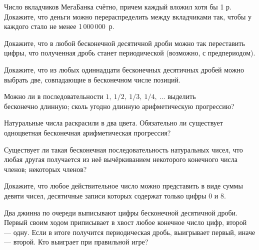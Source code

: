 \documentclass[a4paper,12pt]{article}
\begin{document}



Число вкладчиков МегаБанка счётно, причем каждый вложил хотя бы 1 р.
Докажите, что деньги можно перераспределить между вкладчиками так,
чтобы у каждого стало не менее 1\,000\,000~р.

Докажите, что в любой бесконечной десятичной дроби можно так переставить
цифры, что полученная дробь станет периодической
(возможно, с предпериодом).

Докажите, что
из любых одиннадцати бесконечных десятичных дробей можно
выбрать две, совпадающие в бесконечном числе позиций.



 Можно ли в последовательности
$1, \ 1/2, \ 1/3, \ 1/4, \ \dots$
выделить\\
 бесконечно длинную;
 сколь угодно длинную арифметическую прогрессию?

Натуральные числа раскрасили в два цвета. Обязательно ли существует одноцветная бесконечная арифметическая прогрессия?

Существует ли такая бесконечная последовательность натуральных чисел,
что любая другая получается из неё вычёркиванием
 некоторого конечного числа членов;
 некоторых членов?



Докажите, что любое действительное число можно представить в виде
суммы девяти чисел, десятичные записи которых содержат только цифры 0 и 8.





 Два джинна по очереди выписывают цифры бесконечной
десятичной дроби. Первый своим ходом приписывает в хвост любое
конечное число цифр, второй --- одну. Если в итоге получится
периодическая дробь,  выигрывает первый, иначе --- второй. Кто
выиграет при правильной игре? %
\end{document}
